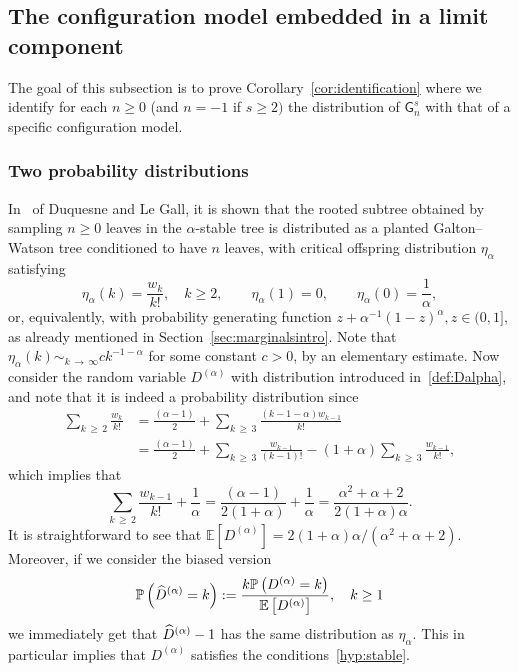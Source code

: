 \documentclass[10pt]{amsart}
\theoremstyle{definition}\newtheorem{defi}[theo]{Definition}\newtheorem{rema}[theo]{Remark}\newtheorem{exam}[theo]{Example}\newtheorem{exem}[theo]{Example}\newtheorem{nota}[theo]{Notation}
\newcommand{\sG}{\mathsf{G}}
\newcommand{\bbE}{\mathbb{E}}
\newcommand{\bbP}{\mathbb{P}}
\let\oldhat\hat
\renewcommand*{\hat}[1]{\mathchoice{\widehat{#1}}{\widehat{#1}}{\oldhat{#1}}{\oldhat{#1}}}
\begin{document}
\subsection{The configuration model embedded in a limit component}\label{sec:configembedded}

The goal of this subsection is to prove Corollary~\ref{cor:identification} where we identify for each $n \geq 0$ (and $n=-1$ if $s\geq 2)$ the distribution of $\sG_n^s$ with that of a specific configuration model.

\subsubsection{Two probability distributions}
In~\cite[Section~3.3]{DuquesneLeGall} of Duquesne and Le Gall, it is shown that the rooted subtree obtained by sampling $n \geq 0$ leaves in the $\alpha$-stable tree is distributed as a planted Galton--Watson tree conditioned to have $n$ leaves, with critical offspring distribution $\eta_\alpha$ satisfying
\[
\eta_\alpha(k)=\frac{w_k}{k!}, \quad k \geq 2, \quad \quad \eta_\alpha(1)=0, \quad \quad \eta_\alpha(0)=\frac{1}{\alpha},
\]
or, equivalently, with probability generating function $z+\alpha^{-1}(1-z)^{\alpha}, z \in (0,1],$ as already mentioned in Section~\ref{sec:marginalsintro}. Note that $\eta_{\alpha}(k) \sim_{k\,\rightarrow\,\infty} c k^{-1-\alpha}$ for some constant $c>0$, by an elementary estimate. Now consider the random variable $D^{(\alpha)}$ with distribution introduced in~\eqref{def:Dalpha}, and note that it is indeed a probability distribution since
\begin{align*}
\sum_{k\,\geq\,2}\frac{w_k}{k!} &=\frac{(\alpha-1)}{2}+\sum_{k\,\geq\,3}\frac{\left(k-1-\alpha\right)w_{k-1}}{k!}\\
 &= \frac{(\alpha-1)}{2}+\sum_{k\,\geq\,3}\frac{w_{k-1}}{(k-1)!}-(1+\alpha) \sum_{k\,\geq\,3}\frac{w_{k-1}}{k!},
\end{align*}
which implies that
\[
\sum_{k\,\geq\,2}\frac{w_{k-1}}{k!}+\frac{1}{\alpha}= \frac{(\alpha-1)}{2(1+\alpha)}+\frac{1}{\alpha}=\frac{\alpha^2+\alpha+2}{2(1+\alpha)\alpha}.
\]
It is straightforward to see that $\bbE[D^{(\alpha)}]=2(1+\alpha)\alpha/(\alpha^2+\alpha+2)$. Moreover, if we consider the biased version
\[
\bbP\left(\hat{D}^{(\alpha)}=k\right):=\frac{k \bbP\left(D^{(\alpha)}=k\right)}{\bbE\left[D^{(\alpha)}\right]}, \quad k\geq 1
\]
we immediately get that $\hat{D}^{(\alpha)}-1$ has the same distribution as $\eta_\alpha$. This in particular implies that $D^{(\alpha)}$ satisfies the conditions~\eqref{hyp:stable}.
\end{document}
